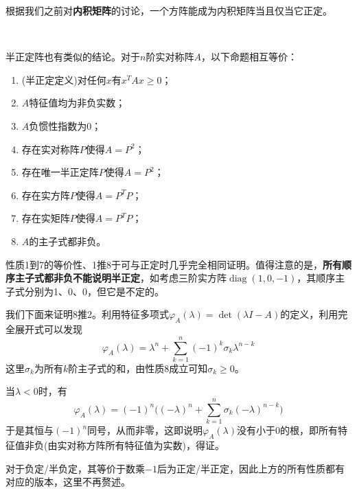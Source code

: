 \documentclass[a4paper,UTF8,fontset=windows]{ctexart}
\DeclareMathOperator{\diag}{diag}
\newcommand*{\note}{\noindent *}
\begin{document}
\note 根据我们之前对\textbf{内积矩阵}的讨论，一个方阵能成为内积矩阵当且仅当它正定。

\

半正定阵也有类似的结论。对于$n$阶实对称阵$A$，以下命题相互等价：
\begin{enumerate}
    \item (半正定定义)对任何$x$有$x^TAx\ge0$；
    \item $A$特征值均为非负实数；
    \item $A$负惯性指数为0；
    \item 存在实对称阵$P$使得$A=P^2$；
    \item 存在唯一半正定阵$P$使得$A=P^2$；
    \item 存在实方阵$P$使得$A=P^TP$；
    \item 存在实矩阵$P$使得$A=P^TP$；
    \item $A$的主子式都非负。
\end{enumerate}

性质1到7的等价性、1推8于可与正定时几乎完全相同证明。值得注意的是，\textbf{所有顺序主子式都非负不能说明半正定}，如考虑三阶实方阵$\diag(1,0,-1)$，其顺序主子式分别为1、0、0，但它是不定的。

我们下面来证明8推2。利用特征多项式$\varphi_A(\lambda)=\det(\lambda I-A)$的定义，利用完全展开式可以发现
$$\varphi_A(\lambda)=\lambda^n+\sum_{k=1}^n(-1)^k\sigma_k\lambda^{n-k}$$
这里$\sigma_k$为所有$k$阶主子式的和，由性质8成立可知$\sigma_k\ge0$。

当$\lambda<0$时，有
$$\varphi_A(\lambda)=(-1)^n\bigg((-\lambda)^n+\sum_{k=1}^n\sigma_k(-\lambda)^{n-k}\bigg)$$
于是其恒与$(-1)^n$同号，从而非零，这即说明$\varphi_A(\lambda)$没有小于0的根，即所有特征值非负(由实对称方阵所有特征值为实数)，得证。

\note 对于负定/半负定，其等价于数乘$-1$后为正定/半正定，因此上方的所有性质都有对应的版本，这里不再赘述。
\end{document}
